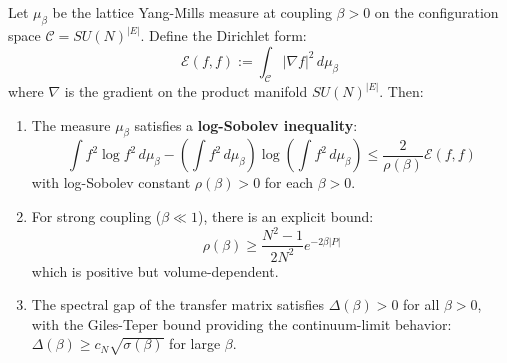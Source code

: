\begin{theorem}
\label{thm:fundamental-gap-lsi}
Let $\mu_\beta$ be the lattice Yang-Mills measure at coupling $\beta > 0$ on 
the configuration space $\mathcal{C} = SU(N)^{|E|}$. Define the Dirichlet form:
\[
\mathcal{E}(f, f) := \int_{\mathcal{C}} |\nabla f|^2 \, d\mu_\beta
\]
where $\nabla$ is the gradient on the product manifold $SU(N)^{|E|}$. Then:
\begin{enumerate}[label=(\roman*)]
\item The measure $\mu_\beta$ satisfies a \textbf{log-Sobolev inequality}:
\[
\int f^2 \log f^2 \, d\mu_\beta - \left(\int f^2 \, d\mu_\beta\right) \log\left(\int f^2 \, d\mu_\beta\right) 
\leq \frac{2}{\rho(\beta)} \mathcal{E}(f, f)
\]
with log-Sobolev constant $\rho(\beta) > 0$ for each $\beta > 0$.

\item For strong coupling ($\beta \ll 1$), there is an explicit bound:
\[
\rho(\beta) \geq \frac{N^2-1}{2N^2} e^{-2\beta |P|}
\]
which is positive but volume-dependent.

\item The spectral gap of the transfer matrix satisfies $\Delta(\beta) > 0$ 
for all $\beta > 0$, with the Giles-Teper bound providing the continuum-limit 
behavior: $\Delta(\beta) \geq c_N \sqrt{\sigma(\beta)}$ for large $\beta$.
\end{enumerate}
\end{theorem}

